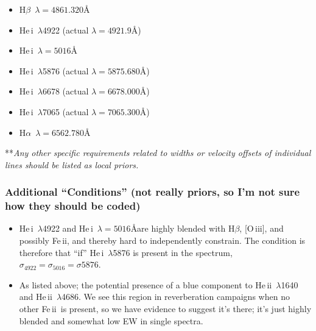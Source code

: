 \documentclass[12pt,letterpaper]{article}
\newcommand{\Halpha}{\ifmmode {\rm H}\alpha \else H$\alpha$\fi}
\newcommand{\Hbeta}{\ifmmode {\rm H}\beta \else H$\beta$\fi}
\newcommand{\HeII}{\ifmmode {\rm He}\,{\sc ii}\,\lambda4686 \else 
	           He\,{\sc ii}\,$\lambda4686$\fi}
\newcommand{\hei}{He\,{\sc i}}
\newcommand{\heii}{He\,{\sc ii}}
\newcommand{\feii}{Fe\,{\sc ii}}
\newcommand{\oiii}{O\,{\sc iii}}
\begin{document}
\begin{itemize}
          \begin{itemize}
          \item {\bf Local Prior:} set very loose priors on existence,
            location and strength; if the overall region fits better
            between \HeII\ and potential presence of \feii\ and host
            with the addition of a blue component, go with it; I'm not
            sure what's relevant here for coding... I can maybe try to
            come up with some better priors from looking at data I have,
            but probably best to just leave it loose and see how it
            does.
        \end{itemize}
      \item \Hbeta\ $\lambda=4861.320$\AA
      \item \hei\, $\lambda$4922 (actual $\lambda=4921.9$\AA)
      \item \hei\ $\lambda=5016$\AA 
      \item \hei\, $\lambda$5876 (actual $\lambda=5875.680$\AA) 
      \item \hei\, $\lambda$6678 (actual $\lambda=6678.000$\AA) 
      \item \hei\, $\lambda$7065 (actual $\lambda=7065.300$\AA) 
      \item \Halpha\ $\lambda=6562.780$\AA
    \end{itemize}

**{\it Any other specific requirements related to widths or velocity offsets of individual lines should be listed as local priors.}


\subsubsection*{Additional ``Conditions'' (not really priors, so I'm not sure how they should be coded)}
\begin{itemize}
  \item \hei\, $\lambda$4922 and \hei\ $\lambda=5016$\AA are highly
    blended with \Hbeta, [\oiii], and possibly \feii, and thereby hard to
    independently constrain.  The condition is therefore that ``if''
    \hei\, $\lambda$5876 is present in the spectrum,
    $\sigma_{4922}=\sigma_{5016}=\sigma{5876}$.
  \item As listed above; the potential presence of a blue component to
    \heii\, $\lambda$1640 and \heii\, $\lambda$4686.  We see this region
    in reverberation campaigns when no other \feii\ is present, so we
    have evidence to suggest it's there; it's just highly blended and
    somewhat low EW in single spectra.
\end{itemize} 
    




\end{document}
